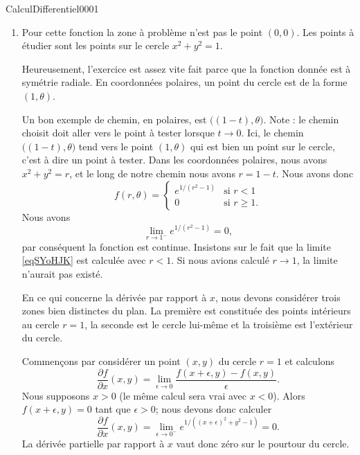 \begin{corrige}{CalculDifferentiel0001}
\begin{enumerate}
		\item
			Pour cette fonction la zone à problème n'est pas le point $(0,0)$. Les points à étudier sont les points sur le cercle $x^2+y^2=1$.

			Heureusement, l'exercice est assez vite fait parce que la fonction donnée est à symétrie radiale. En coordonnées polaires, un point du cercle est de la forme $(1,\theta)$. 
            
            Un bon exemple de chemin, en polaires, est $\big( (1-t),\theta \big)$. Note : le chemin choisit doit aller vers le point à tester lorsque $t\to 0$. Ici, le chemin $\big( (1-t),\theta \big)$ tend vers le point $(1,\theta)$ qui est bien un point sur le cercle, c'est à dire un point à tester. Dans les coordonnées polaires, nous avons $x^2+y^2=r$, et le long de notre chemin nous avons $r=1-t$. Nous avons donc
			\begin{equation}
                f(r,\theta)= \begin{cases}
                    e^{1/(r^2-1)}    &   \text{si } r<1\\
                    0    &    \text{si } r\geq 1.
                \end{cases}
			\end{equation}
            Nous avons
            \begin{equation}        \label{eqSYoHJK}
                \lim_{r\to 1^-} e^{1/(r^2-1)}=0,
            \end{equation}
            par conséquent la fonction est continue. Insistons sur le fait que la limite \eqref{eqSYoHJK} est calculée avec \( r<1\). Si nous avions calculé \( r\to 1\), la limite n'aurait pas existé.

            En ce qui concerne la dérivée par rapport à \( x\), nous devons considérer trois zones bien distinctes du plan. La première est constituée des points intérieurs au cercle \( r=1\), la seconde est le cercle lui-même et la troisième est l'extérieur du cercle.
            
            Commençons par considérer un point \( (x,y)\) du cercle \( r=1\) et calculons
            \begin{equation}
                \frac{ \partial f }{ \partial x }(x,y)=\lim_{\epsilon\to 0}\frac{ f(x+\epsilon,y)-f(x,y) }{ \epsilon }.
            \end{equation}
            Nous supposons \( x>0\) (le même calcul sera vrai avec \( x<0\)). Alors \( f(x+\epsilon,y)=0\) tant que \( \epsilon>0\); nous devons donc calculer
            \begin{equation}
                \frac{ \partial f }{ \partial x }(x,y)=\lim_{\epsilon\to 0^-} e^{1/((x+\epsilon)^2+y^2-1 )}=0.
            \end{equation}
            La dérivée partielle par rapport à \( x\) vaut donc zéro sur le pourtour du cercle. 
            

\end{enumerate}
\end{corrige}
